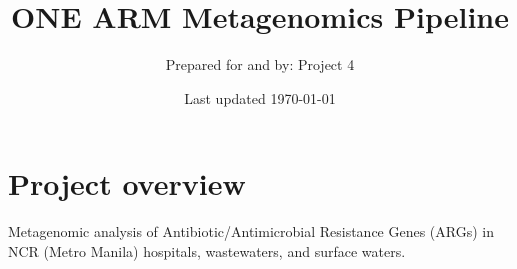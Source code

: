 \documentclass[11pt]{report}
\title{\Huge \textbf{ONE ARM Metagenomics Pipeline}}
\author{\Large Prepared for and by: Project 4}
\date{\Large Last updated \today}
\begin{document}
	\maketitle
	\thispagestyle{empty}
	
	\newpage



\setcounter{tocdepth}{3} 
\tableofcontents  %
\newpage
\newpage
\listoftables      %
\newpage



\pagestyle{fancy}
\fancyhf{}
\fancyhead[C]{\leftmark}  %
\fancyhead[R]{\thepage}

\part{Project overview}


	
	\begin{tcolorbox}
		\raggedright
		\onehalfspacing
		\textbf{} %
		Metagenomic analysis of Antibiotic/Antimicrobial Resistance Genes (ARGs) in NCR (Metro Manila) hospitals, wastewaters, and surface waters.
	\end{tcolorbox}
		
\end{document}
